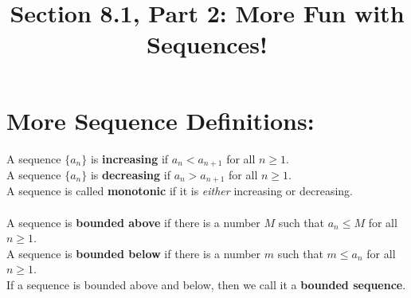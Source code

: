 \documentclass[10pt]{article}
\begin{document}
\newcommand{\an}{\lbrace a_n \rbrace}

\everymath{\displaystyle}

\renewcommand{\myTitle}{MATH 1336: Calculus III}

\renewcommand{\mySubTitle}{Section 8.1, Part 2: More Fun with Sequences! }%



\title{\mySubTitle}\date{}
\maketitle


\setlength{\columnseprule}{0.4pt}
\setlength{\columnsep}{3em}

\hspace*{-.8in}%
\section*{More Sequence Definitions: }

A sequence \(\an\) is \textbf{increasing} if \(a_n < a_{n+1}\) for all \(n\geq 1\).\\
A sequence \(\an\) is \textbf{decreasing} if \(a_n > a_{n+1}\) for all \(n\geq 1\).\\
A sequence is called \textbf{monotonic} if it is \textit{either} increasing or decreasing.\\

~\\

A sequence is \textbf{bounded above} if there is a number \(M\) such that \(a_n\leq M\) for all \(n\geq 1\).\\
A sequence is \textbf{bounded below} if there is a number \(m\) such that \(m\leq a_n\) for all \(n\geq 1\).\\
If a sequence is bounded above and below, then we call it a \textbf{bounded sequence}.\\
\end{document}
